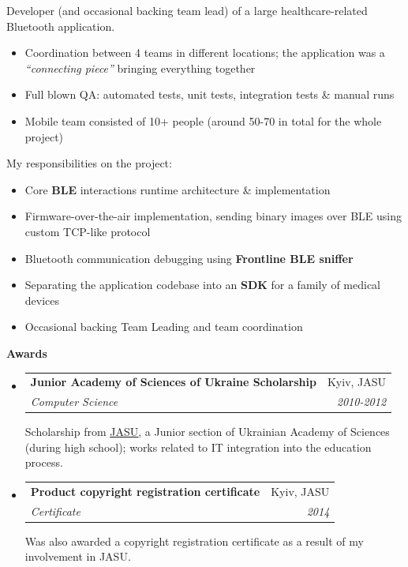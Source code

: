 \documentclass[letterpaper,11pt]{article}
\makeatletter
\newcommand{\resitem}[1]{\item #1 \vspace{-2pt}}
\newcommand{\resheading}[1]{{\vspace{.2in} \large \colorbox{mygrey}{\begin{minipage}{\textwidth}{\textbf{#1 \vphantom{p\^{E}}}}\end{minipage}}}}
\newcommand{\ressubheading}[4]{
\begin{tabular*}{7.1in}{l@{\extracolsep{\fill}}r}
		\textbf{#1} & #2 \\
		\textit{#3} & \textit{#4} \\
\end{tabular*}\vspace{-6pt}}
\makeatother
\begin{document}
\begin{itemize}
		Developer (and occasional backing team lead) of a large healthcare-related Bluetooth application.
		\begin{itemize}
				\resitem{Coordination between 4 teams in different locations; the application was a \textit{``connecting piece''} bringing everything together}
				\resitem{Full blown QA: automated tests, unit tests, integration tests \& manual runs}
				\resitem{Mobile team consisted of 10+ people (around 50-70 in total for the whole project)}
		\end{itemize}

		My responsibilities on the project:
		\begin{itemize}
				\resitem{Core \textbf{BLE} interactions runtime architecture \& implementation}
				\resitem{Firmware-over-the-air implementation, sending binary images over BLE using custom TCP-like protocol}
				\resitem{Bluetooth communication debugging using \textbf{Frontline BLE sniffer}}
				\resitem{Separating the application codebase into an \textbf{SDK} for a family of medical devices}
				\resitem{Occasional backing Team Leading and team coordination}
		\end{itemize}
\end{itemize}

\resheading{Awards}
\begin{itemize}
	\item
		\ressubheading{Junior Academy of Sciences of Ukraine Scholarship}{Kyiv, JASU}{Computer Science}{2010-2012}

		Scholarship from \href{http://man.gov.ua/en}{\textcolor{linkblue}{\underline{JASU}}}, a Junior section of Ukrainian Academy of Sciences (during high school); works related to IT integration into the education process.
	\item
		\ressubheading{Product copyright registration certificate}{Kyiv, JASU}{Certificate \textnumero40491}{2014}

		Was also awarded a copyright registration certificate as a result of my involvement in JASU.
\end{itemize}
\end{document}
